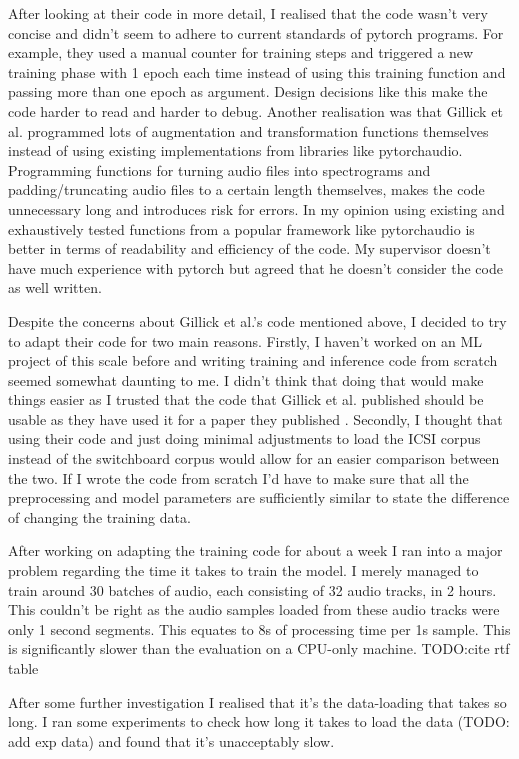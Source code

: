 \documentclass[bsc,frontabs,parskip,deptreport]{infthesis}
\begin{document}
After looking at their code in more detail,  
I realised that the code wasn't very concise and didn't seem to adhere to current standards of pytorch programs. 
For example, they used a manual counter for training steps and triggered a new training phase with 1 epoch each time instead of using this training function and passing more than one epoch as argument. 
Design decisions like this make the code harder to read and harder to debug. 
Another realisation was that Gillick et al. programmed lots of augmentation and transformation functions themselves instead of using existing implementations from libraries like pytorchaudio. 
Programming functions for turning audio files into spectrograms and padding/truncating audio files to a certain length themselves, makes the code unnecessary long and introduces risk for errors. In my opinion using existing and exhaustively tested functions from a popular framework like pytorchaudio is better in terms of readability and efficiency of the code.
My supervisor doesn't have much experience with pytorch but agreed that he doesn't consider the code as well written.

Despite the concerns about Gillick et al.'s code mentioned above, I decided to try to adapt their code for two main reasons. 
Firstly, I haven't worked on an ML project of this scale before and writing training and inference code from scratch seemed somewhat daunting to me. I didn't think that doing that would make things easier as I trusted that the code that Gillick et al. published should be usable as they have used it for a paper they published \cite{gillick2021robust}. 
Secondly, I thought that using their code and just doing minimal adjustments to load the ICSI corpus instead of the switchboard corpus would allow for an easier comparison between the two. If I wrote the code from scratch I'd have to make sure that all the preprocessing and model parameters are sufficiently similar to state the difference of changing the training data. 

After working on adapting the training code for about a week I ran into a major problem regarding the time it takes to train the model. I merely managed to train around 30 batches of audio, each consisting of 32 audio tracks, in 2 hours. This couldn't be right as the audio samples loaded from these audio tracks were only 1 second segments. This equates to 8s of processing time per 1s sample.
This is significantly slower than the evaluation on a CPU-only machine. TODO:cite rtf table

After some further investigation I realised that it's the data-loading that takes so long. I ran some experiments to check how long it takes to load the data (TODO: add exp data) and found that it's unacceptably slow. 
\end{document}

